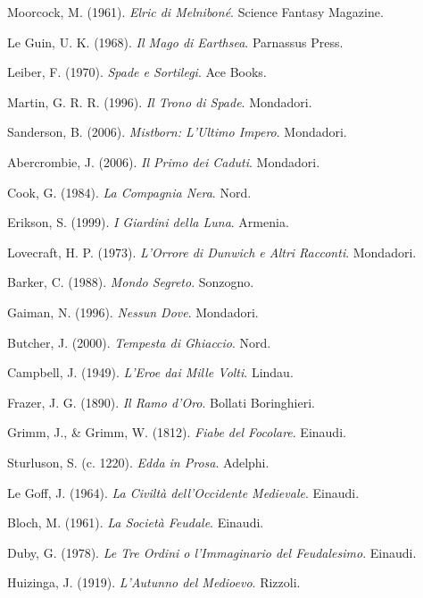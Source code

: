 Moorcock, M. (1961).
\textit{Elric di Melniboné}.
Science Fantasy Magazine.

Le Guin, U. K. (1968).
\textit{Il Mago di Earthsea}.
Parnassus Press.

Leiber, F. (1970).
\textit{Spade e Sortilegi}.
Ace Books.

Martin, G. R. R. (1996).
\textit{Il Trono di Spade}.
Mondadori.

Sanderson, B. (2006).
\textit{Mistborn: L'Ultimo Impero}.
Mondadori.

Abercrombie, J. (2006).
\textit{Il Primo dei Caduti}.
Mondadori.

Cook, G. (1984).
\textit{La Compagnia Nera}.
Nord.

Erikson, S. (1999).
\textit{I Giardini della Luna}.
Armenia.

Lovecraft, H. P. (1973).
\textit{L'Orrore di Dunwich e Altri Racconti}.
Mondadori.

Barker, C. (1988).
\textit{Mondo Segreto}.
Sonzogno.

Gaiman, N. (1996).
\textit{Nessun Dove}.
Mondadori.

Butcher, J. (2000).
\textit{Tempesta di Ghiaccio}.
Nord.

Campbell, J. (1949).
\textit{L'Eroe dai Mille Volti}.
Lindau.

Frazer, J. G. (1890).
\textit{Il Ramo d'Oro}.
Bollati Boringhieri.

Grimm, J., \& Grimm, W. (1812).
\textit{Fiabe del Focolare}.
Einaudi.

Sturluson, S. (c. 1220).
\textit{Edda in Prosa}.
Adelphi.

Le Goff, J. (1964).
\textit{La Civiltà dell'Occidente Medievale}.
Einaudi.

Bloch, M. (1961).
\textit{La Società Feudale}.
Einaudi.

Duby, G. (1978).
\textit{Le Tre Ordini o l'Immaginario del Feudalesimo}.
Einaudi.

Huizinga, J. (1919).
\textit{L'Autunno del Medioevo}.
Rizzoli.

